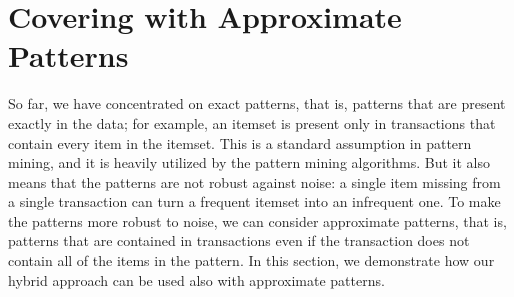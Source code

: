 
\newcommand{\B}{\ensuremath{\{0,1\}}}
\newcommand{\matr}[1]{\ensuremath{\mathbf{#1}}}
\newcommand{\newvec}[1]{\ensuremath{\mathbf{#1}}}
    \newcommand{\nva}{\newvec{a}}
    \newcommand{\nvb}{\newvec{b}}
    \newcommand{\vc}{\newvec{c}}
    \newcommand{\vd}{\newvec{d}}
    \newcommand{\ve}{\newvec{e}}
    \newcommand{\vf}{\newvec{f}}
    \newcommand{\vg}{\newvec{g}}
    \newcommand{\vh}{\newvec{h}}
    \newcommand{\vi}{\newvec{i}}
    \newcommand{\vj}{\newvec{j}}
    \newcommand{\vk}{\newvec{k}}
    \newcommand{\vl}{\newvec{l}}
    \newcommand{\vm}{\newvec{m}}
    \newcommand{\vn}{\newvec{n}}
    \newcommand{\vo}{\newvec{o}}
    \newcommand{\vp}{\newvec{p}}
    \newcommand{\vq}{\newvec{q}}
    \newcommand{\vr}{\newvec{r}}
    \newcommand{\vt}{\newvec{t}}
    \newcommand{\nvu}{\newvec{u}}
    \newcommand{\vv}{\newvec{v}}
    \newcommand{\vw}{\newvec{w}}
    \newcommand{\vx}{\newvec{x}}
    \newcommand{\vy}{\newvec{y}}
    \newcommand{\vz}{\newvec{z}}
    \newcommand{\mA}{\matr{A}}
    \newcommand{\mB}{\matr{B}}
    \newcommand{\mC}{\matr{C}}
    \newcommand{\mD}{\matr{D}}
    \newcommand{\mE}{\matr{E}}
    \newcommand{\mF}{\matr{F}}
    \newcommand{\mG}{\matr{G}}
    \newcommand{\mH}{\matr{H}}
    \newcommand{\mI}{\matr{I}}
    \newcommand{\mJ}{\matr{J}}
    \newcommand{\mK}{\matr{K}}
    \newcommand{\mL}{\matr{L}}
    \newcommand{\mM}{\matr{M}}
    \newcommand{\mN}{\matr{N}}
    \newcommand{\mO}{\matr{O}}
    \newcommand{\mP}{\matr{P}}
    \newcommand{\mQ}{\matr{Q}}
    \newcommand{\mR}{\matr{R}}
    \newcommand{\mS}{\matr{S}}
    \newcommand{\mT}{\matr{T}}
    \newcommand{\mU}{\matr{U}}
    \newcommand{\mV}{\matr{V}}
    \newcommand{\mW}{\matr{W}}
    \newcommand{\mX}{\matr{X}}
    \newcommand{\mY}{\matr{Y}}
    \newcommand{\mZ}{\matr{Z}}


\section{Covering with Approximate Patterns}\label{sec:tiling}

So far, we have concentrated on exact patterns, that is, patterns that are present exactly in the data; for example, an itemset is present only in transactions that contain every item in the itemset. This is a standard assumption in pattern mining, and it is heavily utilized by the pattern mining algorithms. But it also means that the patterns are not robust against noise: a single item missing from a single transaction can turn a frequent itemset into an infrequent one. To make the patterns more robust to noise, we can consider approximate patterns, that is, patterns that are  contained in transactions even if the transaction does not contain all of the items in the pattern. In this section, we demonstrate how our hybrid approach can be used also with approximate patterns.

